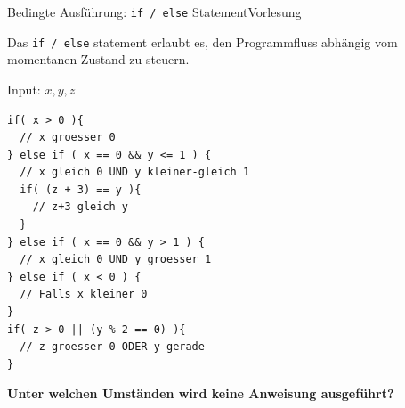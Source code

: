 \documentclass[xcolor=dvipsnames]{beamer}
\newcounter{lecturecounter}
\begin{document}
\begin{frame}[fragile]{Bedingte Ausführung: \texttt{if / else} Statement}{Vorlesung }
\begin{block}{}
  Das \texttt{if / else} statement erlaubt es, den Programmfluss abhängig vom momentanen Zustand zu steuern.
\end{block}
Input: $x, y, z$
\begin{lstlisting}
if( x > 0 ){
  // x groesser 0
} else if ( x == 0 && y <= 1 ) {
  // x gleich 0 UND y kleiner-gleich 1
  if( (z + 3) == y ){
    // z+3 gleich y
  }
} else if ( x == 0 && y > 1 ) {
  // x gleich 0 UND y groesser 1
} else if ( x < 0 ) {
  // Falls x kleiner 0
}
if( z > 0 || (y % 2 == 0) ){
  // z groesser 0 ODER y gerade
}
\end{lstlisting}
\textbf{Unter welchen Umständen wird keine Anweisung ausgeführt?}
\end{frame}
\end{document}
